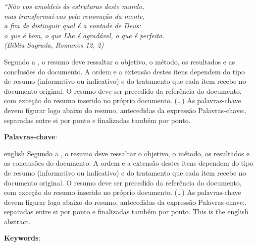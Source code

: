 \documentclass[
	12pt,				%
	openright,			%
    oneside,
	a4paper,			%
	chapter=TITLE,
	english,			%
	brazil				%
	]{./abntex2}
\begin{document}
\begin{epigrafe}
    \vspace*{\fill}
	\begin{flushright}
		\textit{``Não vos amoldeis às estruturas deste mundo, \\
		mas transformai-vos pela renovação da mente, \\
		a fim de distinguir qual é a vontade de Deus: \\
		o que é bom, o que Lhe é agradável, o que é perfeito.\\
		(Bíblia Sagrada, Romanos 12, 2)}
	\end{flushright}
\end{epigrafe}


\setlength{\absparsep}{18pt} %
\begin{resumo}
\SingleSpacing
 Segundo a , o resumo deve ressaltar o
 objetivo, o método, os resultados e as conclusões do documento. A ordem e a extensão
 destes itens dependem do tipo de resumo (informativo ou indicativo) e do
 tratamento que cada item recebe no documento original. O resumo deve ser
 precedido da referência do documento, com exceção do resumo inserido no
 próprio documento. (\ldots) As palavras-chave devem figurar logo abaixo do
 resumo, antecedidas da expressão Palavras-chave:, separadas entre si por
 ponto e finalizadas também por ponto.

 \textbf{Palavras-chave}: \imprimirpalavraschave
\end{resumo}

\begin{resumo}[Abstract]
 \begin{otherlanguage*}{english}
\SingleSpacing
 Segundo a , o resumo deve ressaltar o
 objetivo, o método, os resultados e as conclusões do documento. A ordem e a extensão
 destes itens dependem do tipo de resumo (informativo ou indicativo) e do
 tratamento que cada item recebe no documento original. O resumo deve ser
 precedido da referência do documento, com exceção do resumo inserido no
 próprio documento. (\ldots) As palavras-chave devem figurar logo abaixo do
 resumo, antecedidas da expressão Palavras-chave:, separadas entre si por
 ponto e finalizadas também por ponto.
   This is the english abstract.
   \vspace{\onelineskip}
 
   \noindent 
   \textbf{Keywords}: \imprimirkeywords
 \end{otherlanguage*}
\end{resumo}
\end{document}

